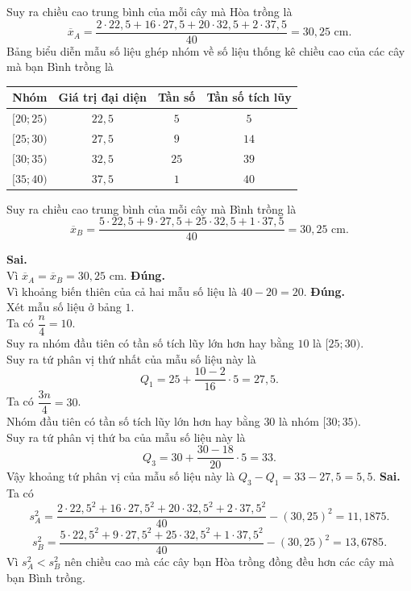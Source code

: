 \begin{ex}
{\begin{center}
\begin{tabular}{|c|c|c|c|}
				\hline
			\end{tabular}
		\end{center}
		Suy ra chiều cao trung bình của mỗi cây mà Hòa trồng là $$\overline{x}_A= \dfrac{2 \cdot 22{,}5 + 16 \cdot 27{,}5 + 20 \cdot 32{,}5 + 2 \cdot 37{,} 5}{40}= 30{,} 25 \text{ cm}.$$
		Bảng biểu diễn mẫu số liệu ghép nhóm về số liệu thống kê chiều cao của các cây mà bạn Bình trồng là
		\begin{center}
			\begin{tabular}{|c|c|c|c|}
				\hline
				Nhóm & Giá trị đại diện & Tần số & Tần số tích lũy\\
				\hline
				$[20 ; 25)$ & $22{,} 5$& $5$ & $5$ \\
				$[25 ; 30)$ & $27{,} 5$ & $9$ & $14$\\
				$[30 ; 35)$ & $32{,} 5$ & $25$ & $39$\\
				$[35 ; 40)$ & $37{,} 5$& $1$ & $40$\\
				\hline
			\end{tabular}
		\end{center}
		Suy ra chiều cao trung bình của mỗi cây mà Bình trồng là $$\overline{x}_B= \dfrac{5 \cdot 22{,}5 + 9 \cdot 27{,}5 + 25 \cdot 32{,}5 + 1\cdot 37{,} 5}{40}= 30{,} 25 \text{ cm}.$$
		\begin{itemchoice}
			\itemch \textbf{Sai.}\\ Vì $\overline{x}_A= \overline{x}_B= 30{,} 25$ cm.
			\itemch \textbf{Đúng.}\\ Vì khoảng biến thiên của cả hai mẫu số liệu là $40-20=20$.
			\itemch \textbf{Đúng.}\\
			Xét mẫu số liệu ở bảng $1$.\\
			Ta có $\dfrac{n}{4} = 10$.\\
			Suy ra nhóm đầu tiên có tần số tích lũy lớn hơn hay bằng $10$ là $ [25; 30)$.\\
			Suy ra tứ phân vị thứ nhất của mẫu số liệu này là $$Q_1= 25 +\dfrac{10 - 2}{16} \cdot 5=27{,}5.$$
			Ta có $\dfrac{3n}{4}= 30$.\\
			Nhóm đầu tiên có tần số tích lũy lớn hơn hay bằng $30$ là nhóm $[30; 35)$.\\
			Suy ra tứ phân vị thứ ba của mẫu số liệu này là $$Q_3= 30 +\dfrac{30- 18}{20} \cdot 5=33.$$
			Vậy khoảng tứ phân vị của mẫu số liệu này là $Q_3-Q_1= 33- 27{,}5 = 5{,}5.$ 
			\itemch \textbf{Sai.}\\
			Ta có $$s^2_A = \dfrac{2 \cdot 22{,}5^2 + 16 \cdot 27{,}5^2 + 20 \cdot 32{,}5^2 + 2 \cdot 37{,} 5^2}{40} - (30{,} 25)^2= 11{,} 1875.$$
			$$s^2_B=\dfrac{5 \cdot 22{,}5^2 + 9 \cdot 27{,}5^2 + 25 \cdot 32{,}5^2 + 1\cdot 37{,} 5^2}{40}-(30{,}25)^2= 13{,} 6785.$$
			Vì $s_A^2 <s_B^2$ nên chiều cao mà các cây bạn Hòa trồng đồng đều hơn các cây mà bạn Bình trồng.
	\end{itemchoice}}
\end{ex}

